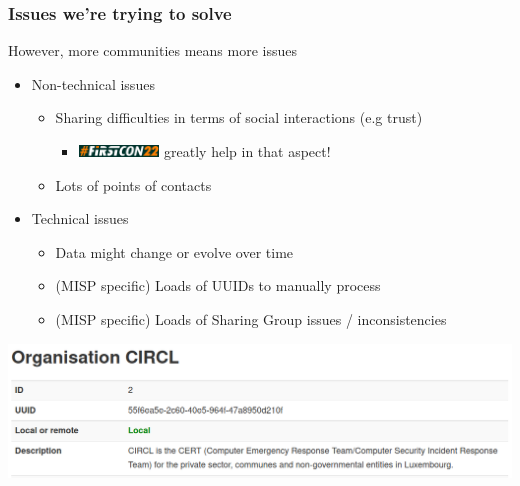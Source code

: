 \begin{frame}
\frametitle{Issues we're trying to solve}
    However, more communities means more issues

    \begin{itemize}
        \item {Non-technical issues}
        \begin{itemize}
            \item Sharing difficulties in terms of social interactions (e.g trust)
            \begin{itemize}
                \item \includegraphics[width=80px]{pictures/firstcon-22.png} greatly help in that aspect!
            \end{itemize}
            \item Lots of points of contacts
        \end{itemize}
    \end{itemize}

    \begin{itemize}
        \item {Technical issues}
        \begin{itemize}
            \item Data might change or evolve over time
            \item (MISP specific) Loads of UUIDs to manually process
            \item (MISP specific) Loads of Sharing Group issues / inconsistencies
        \end{itemize}
    \end{itemize}
    \begin{center}
        \includegraphics[width=0.8\linewidth]{pictures/org-circl.png}
    \end{center}
\end{frame}

